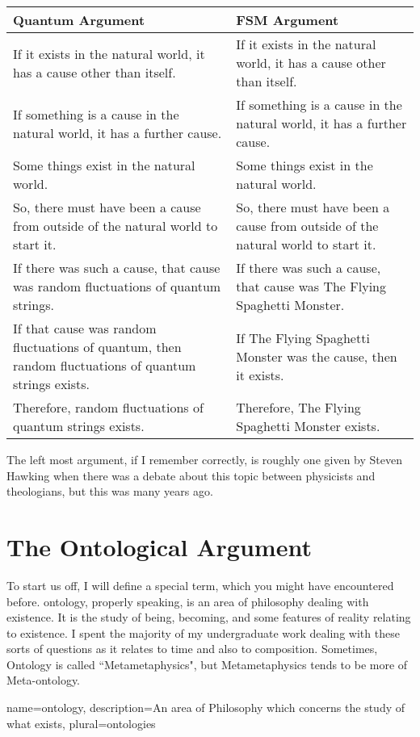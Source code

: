 \noindent
\begin{tabular}{p{2.75in}|p{2.75in}}
Quantum Argument&FSM Argument\\\hline
    If it exists in the natural world, it has a cause other than itself.&If it exists in the natural world, it has a cause other than itself.\\
    If something is a cause in the natural world, it has a further cause.&    If something is a cause in the natural world, it has a further cause.\\
    Some things exist in the natural world.&Some things exist in the natural world.\\
    So, there must have been a cause from outside of the natural world to start it.&So, there must have been a cause from outside of the natural world to start it.\\
    If there was such a cause, that cause was random fluctuations of quantum strings.&    If there was such a cause, that cause was The Flying Spaghetti Monster.\\
    If that cause was random fluctuations of quantum, then random fluctuations of quantum strings exists.& If The Flying Spaghetti Monster was the cause, then it exists.\\
    Therefore, random fluctuations of quantum strings exists.&Therefore, The Flying Spaghetti Monster exists.\\
\end{tabular}

The left most argument, if I remember correctly, is roughly one given by Steven Hawking when there was a debate about this topic between physicists and theologians, but this was many years ago.

\section{The Ontological Argument}
To start us off, I will define a special term, which you might have encountered before. \Gls{ontology}, properly speaking, is an area of philosophy dealing with existence. It is the study of being, becoming, and some features of reality relating to existence.  I spent the majority of my undergraduate work dealing with these sorts of questions as it relates to time and also to composition. Sometimes, Ontology is called ``Metametaphysics", but Metametaphysics tends to be more of Meta-ontology.  

{
name=ontology,
description={An area of Philosophy which concerns the study of what exists},
plural=ontologies
}


